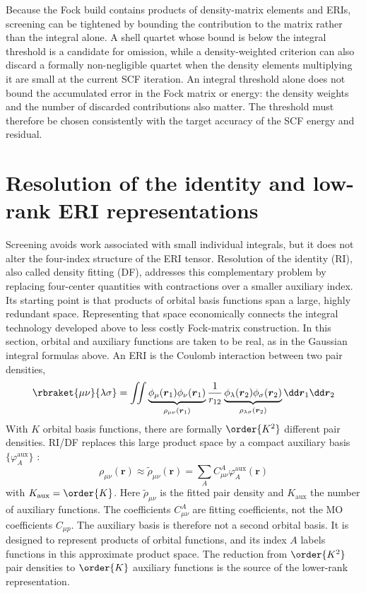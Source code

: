 \documentclass[11pt,a4paper,titlepage]{article}
\numberwithin{equation}{section}
\newcommand{\br}{\boldsymbol{r}}
\begin{document}
Because the Fock build contains products of density-matrix elements and ERIs,
screening can be tightened by bounding the contribution to the matrix rather
than the integral alone. A shell quartet whose bound is below the integral
threshold is a candidate for omission, while a density-weighted criterion can also discard a
formally non-negligible quartet when the density elements multiplying it are
small at the current SCF iteration. An integral threshold alone does not
bound the accumulated error in the Fock matrix or energy: the density
weights and the number of discarded contributions also matter. The threshold
must therefore be chosen consistently with the target accuracy of the SCF
energy and residual.

\section{Resolution of the identity and low-rank ERI representations}
\label{sec:ri}

Screening avoids work associated with small individual integrals, but it does
not alter the four-index structure of the ERI tensor. Resolution of the
identity (RI), also called density fitting (DF), addresses this complementary
problem by replacing four-center quantities with contractions over a smaller
auxiliary index. Its starting point is that products of orbital basis
functions span a large, highly redundant space. Representing that space
economically connects the integral technology developed above to less costly
Fock-matrix construction.
In this section, orbital and auxiliary functions are taken to be real, as in
the Gaussian integral formulas above. An ERI is the Coulomb interaction
between two pair densities,
\begin{equation}
 \rbraket{\mu\nu}{\lambda\sigma}
 =\iint
 \underbrace{\phi_\mu(\br_1)\phi_\nu(\br_1)}_{\rho_{\mu\nu}(\br_1)}
 \frac{1}{r_{12}}
 \underbrace{\phi_\lambda(\br_2)\phi_\sigma(\br_2)}
 _{\rho_{\lambda\sigma}(\br_2)}\dd\br_1\dd\br_2
\end{equation}
With $K$ orbital basis functions, there are formally $\order{K^2}$ different
pair densities. RI/DF replaces this
large product space by a compact auxiliary basis
$\{\varphi_A^\text{aux}\}$ \citep{Whitten1973,Dunlap1979,Vahtras1993}:
\begin{equation}
  \rho_{\mu\nu}(\br)\approx
 \widetilde\rho_{\mu\nu}(\br)
 =\sum_AC_{\mu\nu}^A\varphi_A^\text{aux}(\br)
\end{equation}
with $K_\text{aux}=\order{K}$.
Here $\widetilde\rho_{\mu\nu}$ is the fitted pair density and
$K_\text{aux}$ the number of auxiliary functions. The coefficients
$C_{\mu\nu}^A$ are fitting coefficients, not the MO coefficients
$C_{\mu p}$. The auxiliary basis is therefore not a second orbital basis.
It is designed
to represent products of orbital functions, and its index $A$ labels
functions in this approximate product space. The reduction from
$\order{K^2}$ pair densities to $\order{K}$ auxiliary functions is the source
of the lower-rank representation.
\end{document}
